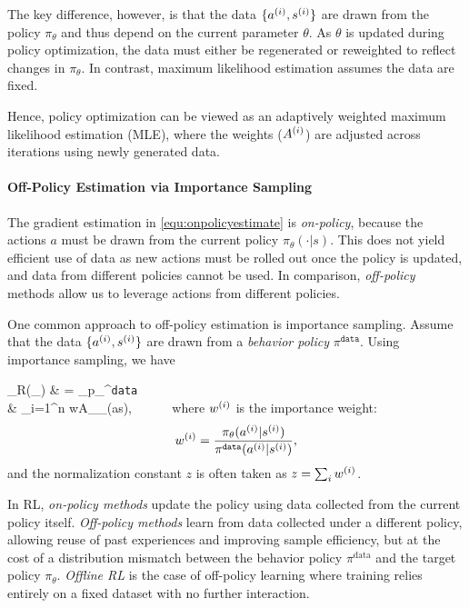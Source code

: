 \documentclass[11pt,letterpaper]{article}
\begin{document}
The key difference, however, is that the data $\{a^{(i)}, s^{(i)}\}$ are drawn from the policy $\pi_\theta$ and thus depend on the current parameter $\theta$. As $\theta$ is updated during policy optimization, the data must either be regenerated or reweighted to reflect changes in $\pi_\theta$. In contrast, maximum likelihood estimation assumes the data are fixed.  

Hence, policy optimization can be viewed as an adaptively weighted maximum likelihood estimation (MLE), where the weights ($A^{(i)}$) are adjusted across iterations using newly generated data.

 

\paragraph{Off-Policy Estimation via Importance Sampling}  
The gradient estimation in \eqref{equ:onpolicyestimate} 
is \emph{on-policy}, 
because the actions $a$ must be drawn from the current policy $\pi_\theta(\cdot | s)$. 
This does not yield efficient use of data
as new actions must be rolled out once the policy is updated, 
and data from different 
policies cannot be used. 
In comparison, \emph{off-policy} methods 
allow us to leverage actions from different policies. 


One common approach to off-policy estimation is importance sampling. 
Assume that the data $\{a^{(i)}, s^{(i)}\}$ are drawn from a \emph{behavior policy} $\pi^{\mathtt{data}}$. 
Using importance sampling, we have 
 
\bb 
\nabla_\theta R(\pi_\theta)  
& = \E_{p_{\pi^{\texttt{data}}}}  \\ 
& \approx {} \sum_{i=1}^n 
w\datai A\datai  \nabla_\theta \log \pi_\theta (a\datai \mid s\datai), ~~~~~ 
\ee 
where $w^{(i)}$ is the importance weight: 
$$
w^{(i)} = \frac{\pi_\theta(a^{(i)}|s^{(i)})}{\pi^{\mathtt{data}}(a^{(i)}|s^{(i)})}, 
$$
and the normalization constant $z$ is often taken as $z = \sum_i w^{(i)}$. 

\begin{cremark}
In RL, \emph{on-policy methods} update the policy using data collected from the current policy itself.  
\emph{Off-policy methods} learn from data collected under a different policy, allowing reuse of past experiences and improving sample efficiency, but at the cost of a distribution mismatch between the behavior policy $\pi^{\text{data}}$ and the target policy $\pi_\theta$.  
\emph{Offline RL} is the case of off-policy learning where training relies entirely on a fixed dataset with no further interaction.  
\end{cremark}
\end{document}

